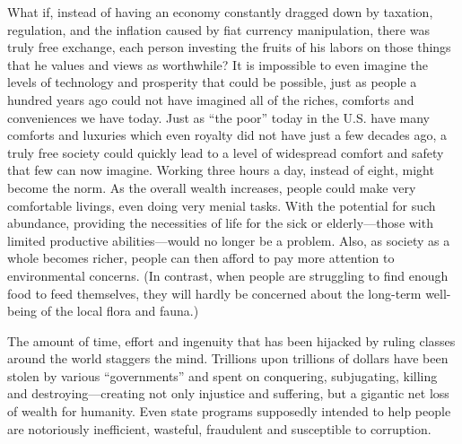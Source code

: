 \documentclass{book}
\begin{document}
What if, instead of having an economy constantly dragged down by taxation, regulation, and the inflation caused by fiat currency manipulation, there was truly free exchange, each person investing the fruits of his labors on those things that he values and views as worthwhile? It is impossible to even imagine the levels of technology and prosperity that could be possible, just as people a hundred years ago could not have imagined all of the riches, comforts and conveniences we have today. Just as \enquote{the poor} today in the U.S. have many comforts and luxuries which even royalty did not have just a few decades ago, a truly free society could quickly lead to a level of widespread comfort and safety that few can now imagine. Working three hours a day, instead of eight, might become the norm. As the overall wealth increases, people could make very comfortable livings, even doing very menial tasks. With the potential for such abundance, providing the necessities of life for the sick or elderly---those with limited productive abilities---would no longer be a problem. Also, as society as a whole becomes richer, people can then afford to pay more attention to environmental concerns. (In contrast, when people are struggling to find enough food to feed themselves, they will hardly be concerned about the long-term well-being of the local flora and fauna.)

The amount of time, effort and ingenuity that has been hijacked by ruling classes around the world staggers the mind. Trillions upon trillions of dollars have been stolen by various \enquote{governments} and spent on conquering, subjugating, killing and destroying---creating not only injustice and suffering, but a gigantic net loss of wealth for humanity. Even state programs supposedly intended to help people are notoriously inefficient, wasteful, fraudulent and susceptible to corruption.
\end{document}
